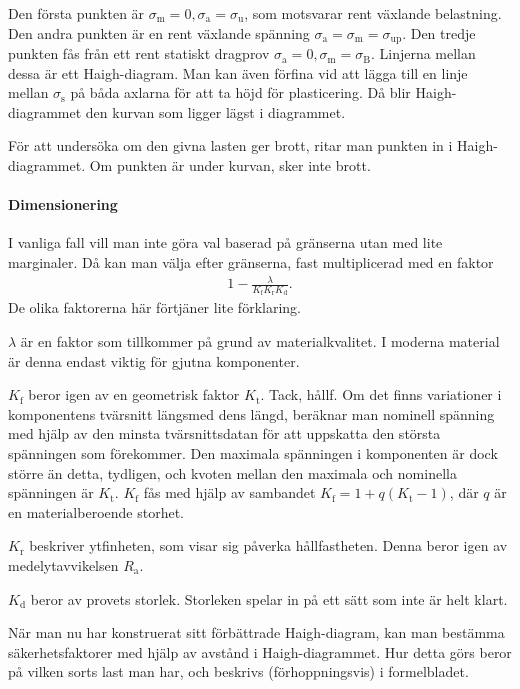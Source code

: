 Den första punkten är $\sigma_{\text{m}} = 0, \sigma_{\text{a}} = \sigma_{\text{u}}$, som motsvarar rent växlande belastning. Den andra punkten är en rent växlande spänning $\sigma_{\text{a}} = \sigma_{\text{m}} = \sigma_{\text{up}}$. Den tredje punkten fås från ett rent statiskt dragprov $\sigma_{\text{a}} = 0, \sigma_{\text{m}} = \sigma_{\text{B}}$. Linjerna mellan dessa är ett Haigh-diagram. Man kan även förfina vid att lägga till en linje mellan $\sigma_{\text{s}}$ på båda axlarna för att ta höjd för plasticering. Då blir Haigh-diagrammet den kurvan som ligger lägst i diagrammet.

För att undersöka om den givna lasten ger brott, ritar man punkten in i Haigh-diagrammet. Om punkten är under kurvan, sker inte brott.

\paragraph{Dimensionering}
I vanliga fall vill man inte göra val baserad på gränserna utan med lite marginaler. Då kan man välja efter gränserna, fast multiplicerad med en faktor
\begin{align*}
	1 - \frac{\lambda}{K_{\text{f}}K_{\text{r}}K_{\text{d}}}.
\end{align*}
De olika faktorerna här förtjäner lite förklaring.

$\lambda$ är en faktor som tillkommer på grund av materialkvalitet. I moderna material är denna endast viktig för gjutna komponenter.

$K_{\text{f}}$ beror igen av en geometrisk faktor $K_{\text{t}}$. Tack, hållf. Om det finns variationer i komponentens tvärsnitt längsmed dens längd, beräknar man nominell spänning med hjälp av den minsta tvärsnittsdatan för att uppskatta den största spänningen som förekommer. Den maximala spänningen i komponenten är dock större än detta, tydligen, och kvoten mellan den maximala och nominella spänningen är $K_{\text{t}}$. $K_{\text{f}}$ fås med hjälp av sambandet $K_{\text{f}} = 1 + q(K_{\text{t}} - 1)$, där $q$ är en materialberoende storhet.

$K_{\text{r}}$ beskriver ytfinheten, som visar sig påverka hållfastheten. Denna beror igen av medelytavvikelsen $R_{\text{a}}$.

$K_{\text{d}}$ beror av provets storlek. Storleken spelar in på ett sätt som inte är helt klart.

När man nu har konstruerat sitt förbättrade Haigh-diagram, kan man bestämma säkerhetsfaktorer med hjälp av avstånd i Haigh-diagrammet. Hur detta görs beror på vilken sorts last man har, och beskrivs (förhoppningsvis) i formelbladet.